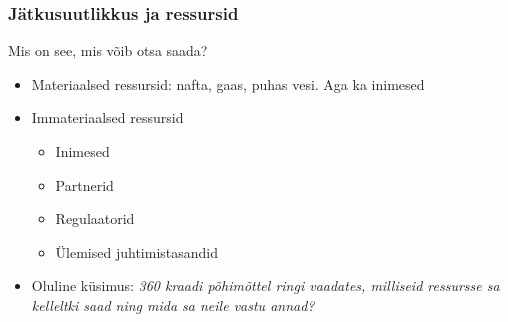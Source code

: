 \begin{frame}[fragile]
  \frametitle{Jätkusuutlikkus ja ressursid}
	Mis on see, mis võib otsa saada?

	\begin{itemize}
		\item Materiaalsed ressursid: nafta, gaas, puhas vesi. Aga ka inimesed
		\item Immateriaalsed ressursid
			\begin{itemize}
				\item Inimesed
				\item Partnerid
				\item Regulaatorid
				\item Ülemised juhtimistasandid
			\end{itemize}		
		\item Oluline küsimus: \emph{360 kraadi põhimõttel ringi vaadates, milliseid ressursse sa kelleltki saad ning mida sa neile vastu annad?}
	\end{itemize}
\end{frame}

